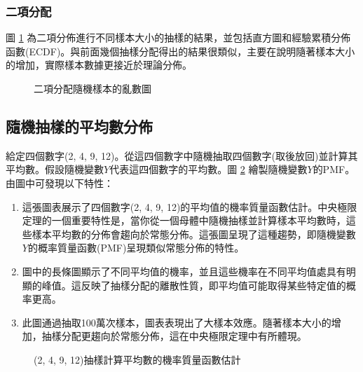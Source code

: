 \subsubsection{二項分配}
圖 \ref{fig:binomial-distribution_sample} 為二項分佈進行不同樣本大小的抽樣的結果，並包括直方圖和經驗累積分佈函數(ECDF)。與前面幾個抽樣分配得出的結果很類似，主要在說明隨著樣本大小的增加，實際樣本數據更接近於理論分佈。
\begin{figure}[h]
    \caption{二項分配隨機樣本的亂數圖}
    \label{fig:binomial-distribution_sample}
\end{figure}

\subsection{隨機抽樣的平均數分佈}
給定四個數字(2, 4, 9, 12)。從這四個數字中隨機抽取四個數字(取後放回)並計算其平均數。假設隨機變數$Y$代表這四個數字的平均數。圖 \ref{fig:sampling-distribution_mean} 繪製隨機變數$Y$的PMF。由圖中可發現以下特性：
\begin{enumerate}
\item 這張圖表展示了四個數字(2, 4, 9, 12)的平均值的機率質量函數估計。中央極限定理的一個重要特性是，當你從一個母體中隨機抽樣並計算樣本平均數時，這些樣本平均數的分佈會趨向於常態分佈。這張圖呈現了這種趨勢，即隨機變數$Y$的概率質量函數(PMF)呈現類似常態分佈的特性。
\item 圖中的長條圖顯示了不同平均值的機率，並且這些機率在不同平均值處具有明顯的峰值。這反映了抽樣分配的離散性質，即平均值可能取得某些特定值的概率更高。
\item 此圖通過抽取100萬次樣本，圖表表現出了大樣本效應。隨著樣本大小的增加，抽樣分配更趨向於常態分佈，這在中央極限定理中有所體現。
\end{enumerate}

\begin{figure}[h]
    \caption{(2, 4, 9, 12)抽樣計算平均數的機率質量函數估計}
    \label{fig:sampling-distribution_mean}
\end{figure}
